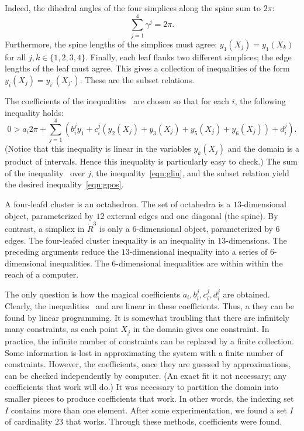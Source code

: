   Indeed, the
dihedral angles of the four simplices along the spine sum to $2\pi$:
\begin{displaymath}
\sum_{j=1}^4 \gamma^j = 2\pi.
\end{displaymath}
Furthermore, the spine lengths of the simplices must agree: $y_1(X_j)
= y_1(X_k)$ for all $j,k\in\{1,2,3,4\}$.  Finally, each leaf flanks
two different simplices; the edge lengths of the leaf must agree.
This gives a collection of inequalities of the form $y_i(X_j) =
y_{i'}(X_{j'})$.  These are the subset relations.

The coefficients of the inequalities~
are chosen so that for each $i$, the following inequality holds:
\begin{equation}\label{eqn:glin}
0 > a_i 2\pi + 
\sum_{j=1}^4 (b_i^j y_1 +  c_i^j (y_2(X_j)+y_3(X_j)+y_5(X_j)+y_6(X_j)) + d_i^j).
\end{equation}
(Notice that this inequality is linear in the variables $y_k(X_j)$ and
the domain is a product of intervals.  Hence this inequality is
particularly easy to check.)  The sum of the
inequality~ over $j$, the inequality~\ref{eqn:glin},
and the subset relation yield the desired inequality~\ref{eqn:gpos}.

A four-leafd cluster is an octahedron.  The set of octahedra is a
$13$-dimensional object, parameterized by $12$ external edges and one
diagonal (the spine).  By contrast, a simpliex in $\ring{R}^3$ is only
a $6$-dimensional object, parameterized by $6$ edges.  The four-leafed
cluster inequality is an inequality in $13$-dimensions.  The preceding
arguments reduce the $13$-dimensional inequality into a series of
$6$-dimensional inequalities.  The $6$-dimensional inequalities are
within within the reach of a computer.

The only question is how the magical coefficients
$a_i,b_i^j,c_i^j,d_i^j$ are obtained.  Clearly, the
inequalities~ and  are linear in these
coefficients.  Thus, a they can be found by linear programming.  It is
somewhat troubling that there are infinitely many constraints, as each
point $X_j$ in the domain gives one constraint.  In practice, the
infinite number of constraints can be replaced by a finite collection.
Some information is lost in approximating the system with a finite
number of constraints.  However, the coefficients, once they are
guessed by approximations, can be checked independently by computer.
(An exact fit it not necessary; any coefficients that work will do.)
It was necessary to partition the domain into smaller pieces to
produce coefficients that work.  In other words, the indexing set $I$
contains more than one element.  After some experimentation, we found
a set $I$ of cardinality $23$ that works.  Through these methods,
coefficients were found.


